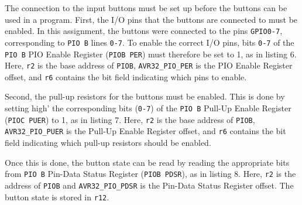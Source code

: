 The connection to the input buttons must be set up before the buttons can be used in a program.
First, the I/O pins that the buttons are connected to must be enabled.
In this assignment, the buttons were connected to the pins \texttt{GPIO0-7}, corresponding to \texttt{PIO B} lines \texttt{0-7}.
To enable the correct I/O pins, bits \texttt{0-7} of the \texttt{PIO B} PIO Enable Register (\texttt{PIOB PER}) must therefore be set to 1, as in listing 6.
Here, \texttt{r2} is the base address of \texttt{PIOB}, \texttt{AVR32\_PIO\_PER} is the PIO Enable Register offset, and \texttt{r6} contains the bit field indicating which pins to enable.


Second, the pull-up resistors for the buttons must be enabled.
This is done by setting high' the corresponding bits (\texttt{0-7}) of the \texttt{PIO B} Pull-Up Enable Register (\texttt{PIOC PUER}) to 1, as in listing 7.
Here, \texttt{r2} is the base address of \texttt{PIOB}, \texttt{AVR32\_PIO\_PUER} is the Pull-Up Enable Register offset, and \texttt{r6} contains the bit field indicating which pull-up resistors should be enabled.


Once this is done, the button state can be read by reading the appropriate bits from \texttt{PIO B} Pin-Data Status Register (\texttt{PIOB PDSR}), as in listing 8.
Here, \texttt{r2} is the address of \texttt{PIOB} and \texttt{AVR32\_PIO\_PDSR} is the Pin-Data Status Register offset.
The button state is stored in \texttt{r12}.

